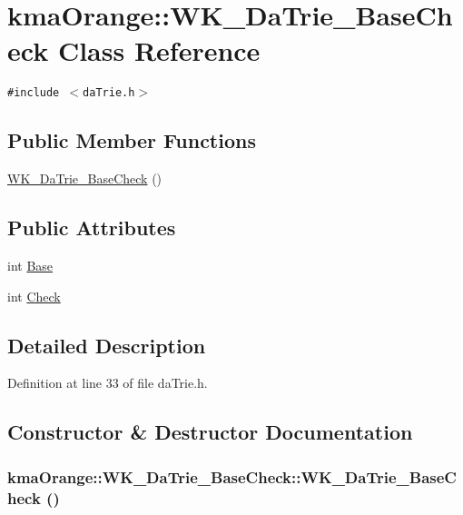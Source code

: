 \hypertarget{classkmaOrange_1_1WK__DaTrie__BaseCheck}{
\section{kmaOrange::WK\_\-DaTrie\_\-BaseCheck Class Reference}
\label{classkmaOrange_1_1WK__DaTrie__BaseCheck}
}
{\tt \#include $<$daTrie.h$>$}

\subsection*{Public Member Functions}
\begin{CompactItemize}
\item 
\hyperlink{classkmaOrange_1_1WK__DaTrie__BaseCheck_ac4a6d2fe0536ea56004ba67386cfd21}{WK\_\-DaTrie\_\-BaseCheck} ()
\end{CompactItemize}
\subsection*{Public Attributes}
\begin{CompactItemize}
\item 
int \hyperlink{classkmaOrange_1_1WK__DaTrie__BaseCheck_3c4a8897a2784e2c1870ecfee3bc06e6}{Base}
\item 
int \hyperlink{classkmaOrange_1_1WK__DaTrie__BaseCheck_5f377e2e67746ca2f6cc1701411f1e56}{Check}
\end{CompactItemize}


\subsection{Detailed Description}


Definition at line 33 of file daTrie.h.

\subsection{Constructor \& Destructor Documentation}
\hypertarget{classkmaOrange_1_1WK__DaTrie__BaseCheck_ac4a6d2fe0536ea56004ba67386cfd21}{
\subsubsection[{WK\_\-DaTrie\_\-BaseCheck}]{\setlength{\rightskip}{0pt plus 5cm}kmaOrange::WK\_\-DaTrie\_\-BaseCheck::WK\_\-DaTrie\_\-BaseCheck ()}}
\label{classkmaOrange_1_1WK__DaTrie__BaseCheck_ac4a6d2fe0536ea56004ba67386cfd21}




